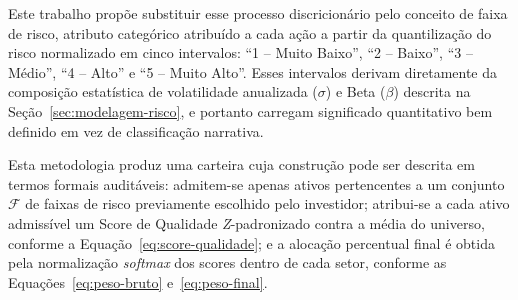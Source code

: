 Este trabalho propõe substituir esse processo discricionário pelo conceito de faixa de risco, atributo categórico atribuído a cada ação a partir da quantilização do risco normalizado em cinco intervalos: ``1 -- Muito Baixo'', ``2 -- Baixo'', ``3 -- Médio'', ``4 -- Alto'' e ``5 -- Muito Alto''. Esses intervalos derivam diretamente da composição estatística de volatilidade anualizada ($\sigma$) e Beta ($\beta$) descrita na Seção~\ref{sec:modelagem-risco}, e portanto carregam significado quantitativo bem definido em vez de classificação narrativa.

Esta metodologia produz uma carteira cuja construção pode ser descrita em termos formais auditáveis: admitem-se apenas ativos pertencentes a um conjunto $\mathcal{F}$ de faixas de risco previamente escolhido pelo investidor; atribui-se a cada ativo admissível um Score de Qualidade \textit{Z}-padronizado contra a média do universo, conforme a Equação~\ref{eq:score-qualidade}; e a alocação percentual final é obtida pela normalização \textit{softmax} dos scores dentro de cada setor, conforme as Equações~\ref{eq:peso-bruto} e~\ref{eq:peso-final}.

